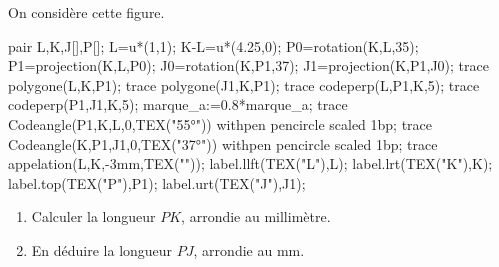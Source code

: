     On considère cette figure.
    \begin{Geometrie}
        pair L,K,J[],P[];
        L=u*(1,1);
        K-L=u*(4.25,0);
        P0=rotation(K,L,35);
        P1=projection(K,L,P0);
        J0=rotation(K,P1,37);
        J1=projection(K,P1,J0);
        trace polygone(L,K,P1);
        trace polygone(J1,K,P1);
        trace codeperp(L,P1,K,5);
        trace codeperp(P1,J1,K,5);
        marque_a:=0.8*marque_a;
        trace Codeangle(P1,K,L,0,TEX("\ang{55}")) withpen pencircle scaled 1bp;
        trace Codeangle(K,P1,J1,0,TEX("\ang{37}")) withpen pencircle scaled 1bp;
        trace appelation(L,K,-3mm,TEX(""));
        label.llft(TEX("L"),L);
        label.lrt(TEX("K"),K);
        label.top(TEX("P"),P1);
        label.urt(TEX("J"),J1);
    \end{Geometrie}

    \begin{enumerate}
        \item Calculer la longueur $PK$, arrondie au millimètre.

        {\color{red}}
        \item En déduire la longueur $PJ$, arrondie au mm.

        {\color{red}}
    \end{enumerate}

